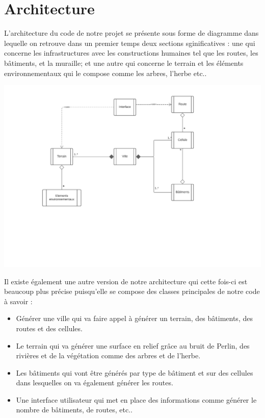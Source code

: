 \section{Architecture}

L'architecture du code de notre projet se présente sous forme de diagramme dans lequelle on retrouve dans un premier temps deux sections sginificatives : une qui concerne les infrastructures avec les constructions humaines tel que les routes, les bâtiments, et la muraille; et une autre qui concerne le terrain et les éléments environnementaux qui le compose comme les arbres, l'herbe etc..

\begin{center}
    \centering
    \includegraphics[height = 8 cm]{images/DiagrammeSimple.pdf}\\
\end{center}

Il existe également une autre version de notre architecture qui cette fois-ci est beaucoup plus précise puisqu'elle se compose des classes principales de notre code à savoir :
\begin{itemize}
	\item Générer une ville qui va faire appel à générer un terrain, des bâtiments, des routes et des cellules.
	\item Le terrain qui va générer une surface en relief grâce au bruit de Perlin, des rivières et de la végétation comme des arbres et de l'herbe.
	\item Les bâtiments qui vont être générés par type de bâtiment et sur des cellules dans lesquelles on va également générer les routes.
	\item Une interface utilisateur qui met en place des informations comme générer le nombre de bâtiments, de routes, etc..
\end{itemize}


